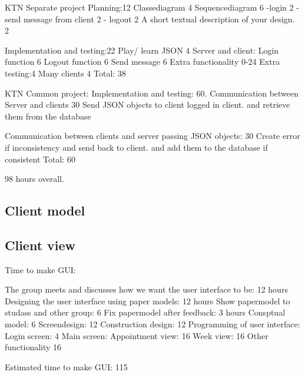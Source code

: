 \documentclass[a4paper, english, 12pt]{article}
\begin{document}
KTN Separate project
Planning:12
	Classediagram 4
	Sequencediagram 6
		-login 2
		- send message from client 2
		- logout 2
	A short textual description of your design. 2

Implementation and testing:22
	Play/ learn JSON 4
	Server and client:
		Login function 6
		Logout function 6
		Send message 6
	Extra functionality 0-24
Extra testing:4
	Many clients 4
Total: 38

KTN Common project:
Implementation and testing: 60.
	Communication between Server and clients 30
		Send JSON objects to client logged in client. 
        and retrieve them from the database
		
	Communication between clients and server passing JSON objects: 30
		Create error if inconsistency and send back to client. 
        and add them to the database if consistent
Total: 60

98 hours overall. 
\subsection{Client model}

\subsection{Client view}
Time to make GUI:

The group meets and discusses how we want the user interface to be: 12 hours
Designing the user interface using paper models: 12 hours
Show papermodel to studass and other group: 6
Fix papermodel after feedback: 3 hours
Consptual model: 6
Screendesign: 12
Construction design: 12
	Programming of user interface: 
	Login screen: 4
	Main screen:
		Appointment view: 16
		Week view: 16
		Other functionality 16

Estimated time to make GUI: 115
\end{document}
